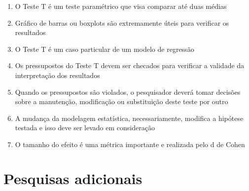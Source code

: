 \documentclass[
]{book}
\providecommand{\tightlist}{%
  \setlength{\itemsep}{0pt}\setlength{\parskip}{0pt}}
\begin{document}
\begin{enumerate}
\def\labelenumi{\arabic{enumi}.}
\tightlist
\item
  O Teste T é um teste paramétrico que visa comparar até duas médias\\
\item
  Gráfico de barras ou boxplots são extremamente úteis para verificar os resultados\\
\item
  O Teste T é um caso particular de um modelo de regressão\\
\item
  Os pressupostos do Teste T devem ser checados para verificar a validade da interpretação dos resultados\\
\item
  Quando os pressupostos são violados, o pesquisador deverá tomar decisões sobre a manutenção, modificação ou substituição deste teste por outro\\
\item
  A mudança da modelagem estatística, necessariamente, modifica a hipótese testada e isso deve ser levado em consideração\\
\item
  O tamanho do efeito é uma métrica importante e realizada pelo d de Cohen\\
\end{enumerate}

\hypertarget{pesquisas-adicionais-3}{%
\section{Pesquisas adicionais}\label{pesquisas-adicionais-3}}
\end{document}
